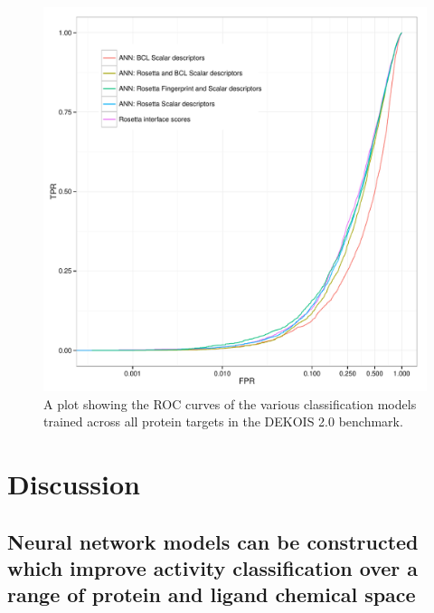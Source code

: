 \begin{figure}
\centering
\includegraphics[width=6in]{figures/hts/tpr_fpr_overall.pdf}
\caption{
A plot showing the \acs{ROC} curves of the various classification models trained across all protein targets in the DEKOIS 2.0 benchmark.
}
\label{fig:tpr_fpr_overall}
\end{figure}

\section{Discussion}

\subsection{Neural network models can be constructed which improve activity classification over a range of protein and ligand chemical space}

